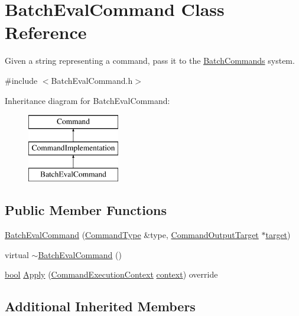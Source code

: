 \hypertarget{class_batch_eval_command}{}\section{Batch\+Eval\+Command Class Reference}
\label{class_batch_eval_command}


Given a string representing a command, pass it to the \hyperlink{class_batch_commands}{Batch\+Commands} system.  




{\ttfamily \#include $<$Batch\+Eval\+Command.\+h$>$}

Inheritance diagram for Batch\+Eval\+Command\+:\begin{figure}[H]
\begin{center}
\leavevmode
\includegraphics[height=3.000000cm]{class_batch_eval_command}
\end{center}
\end{figure}
\subsection*{Public Member Functions}
\begin{DoxyCompactItemize}
\item 
\hyperlink{class_batch_eval_command_acaa3f85daa860c3a34e2928d3e3dbc07}{Batch\+Eval\+Command} (\hyperlink{class_command_type}{Command\+Type} \&type, \hyperlink{class_command_output_target}{Command\+Output\+Target} $\ast$\hyperlink{lib_2expat_8h_a15a257516a87decb971420e718853137}{target})
\item 
virtual \hyperlink{class_batch_eval_command_ab095aa9ac4db28f5e644a845610fdb9e}{$\sim$\+Batch\+Eval\+Command} ()
\item 
\hyperlink{mac_2config_2i386_2lib-src_2libsoxr_2soxr-config_8h_abb452686968e48b67397da5f97445f5b}{bool} \hyperlink{class_batch_eval_command_ad09e13ae2c0e2dcda2faa346232deb79}{Apply} (\hyperlink{class_command_execution_context}{Command\+Execution\+Context} \hyperlink{structcontext}{context}) override
\end{DoxyCompactItemize}
\subsection*{Additional Inherited Members}


